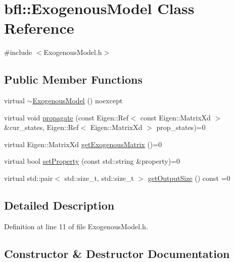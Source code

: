 \hypertarget{classbfl_1_1ExogenousModel}{}\section{bfl\+:\+:Exogenous\+Model Class Reference}
\label{classbfl_1_1ExogenousModel}


{\ttfamily \#include $<$Exogenous\+Model.\+h$>$}

\subsection*{Public Member Functions}
\begin{DoxyCompactItemize}
\item 
virtual \mbox{\hyperlink{classbfl_1_1ExogenousModel_a5d49c4215e05363a149e794bd69e7f1a}{$\sim$\+Exogenous\+Model}} () noexcept
\item 
virtual void \mbox{\hyperlink{classbfl_1_1ExogenousModel_a9f3ec7b8fa1a6c1bb4f5889ba85e6d91}{propagate}} (const Eigen\+::\+Ref$<$ const Eigen\+::\+Matrix\+Xd $>$ \&cur\+\_\+states, Eigen\+::\+Ref$<$ Eigen\+::\+Matrix\+Xd $>$ prop\+\_\+states)=0
\item 
virtual Eigen\+::\+Matrix\+Xd \mbox{\hyperlink{classbfl_1_1ExogenousModel_a417f98b64e17a14af2d57e583cb119ea}{get\+Exogenous\+Matrix}} ()=0
\item 
virtual bool \mbox{\hyperlink{classbfl_1_1ExogenousModel_a240432e20121e83787c83de64360a58a}{set\+Property}} (const std\+::string \&property)=0
\item 
virtual std\+::pair$<$ std\+::size\+\_\+t, std\+::size\+\_\+t $>$ \mbox{\hyperlink{classbfl_1_1ExogenousModel_a68fef857e5d251be2865eb6fd7642f1a}{get\+Output\+Size}} () const =0
\end{DoxyCompactItemize}


\subsection{Detailed Description}


Definition at line 11 of file Exogenous\+Model.\+h.



\subsection{Constructor \& Destructor Documentation}
\mbox{\label{classbfl_1_1ExogenousModel_a5d49c4215e05363a149e794bd69e7f1a}} 
